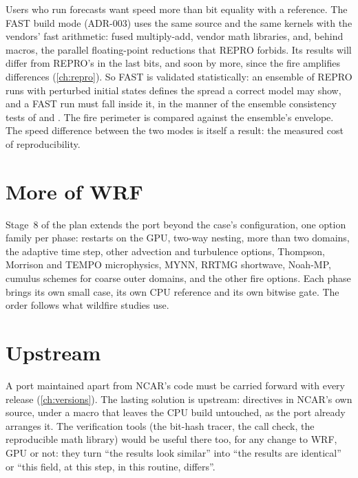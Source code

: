 Users who run forecasts want speed more than bit equality with a reference. The FAST build mode (ADR-003) uses the
same source and the same kernels with the vendors' fast arithmetic: fused multiply-add, vendor math libraries, and,
behind macros, the parallel floating-point reductions that REPRO forbids. Its results will differ from REPRO's in
the last bits, and soon by more, since the fire amplifies differences (\cref{ch:repro}). So FAST is validated
statistically: an ensemble of REPRO runs with perturbed initial states defines the spread a correct model may show,
and a FAST run must fall inside it, in the manner of the ensemble consistency tests of \citet{baker2015} and
\citet{milroy2018}. The fire perimeter is compared against the ensemble's envelope. The speed difference between the
two modes is itself a result: the measured cost of reproducibility.

\section{More of WRF}

Stage~8 of the plan extends the port beyond the case's configuration, one option family per phase: restarts on the
GPU, two-way nesting, more than two domains, the adaptive time step, other advection and turbulence options,
Thompson, Morrison and TEMPO microphysics, MYNN, RRTMG shortwave, Noah-MP, cumulus schemes for coarse outer domains,
and the other fire options. Each phase brings its own small case, its own CPU reference and its own bitwise gate. The
order follows what wildfire studies use.

\section{Upstream}

A port maintained apart from NCAR's code must be carried forward with every release (\cref{ch:versions}). The lasting
solution is upstream: directives in NCAR's own source, under a macro that leaves the CPU build untouched, as the port
already arranges it. The verification tools (the bit-hash tracer, the call check, the reproducible math library)
would be useful there too, for any change to WRF, GPU or not: they turn ``the results look similar'' into ``the
results are identical'' or ``this field, at this step, in this routine, differs''.
